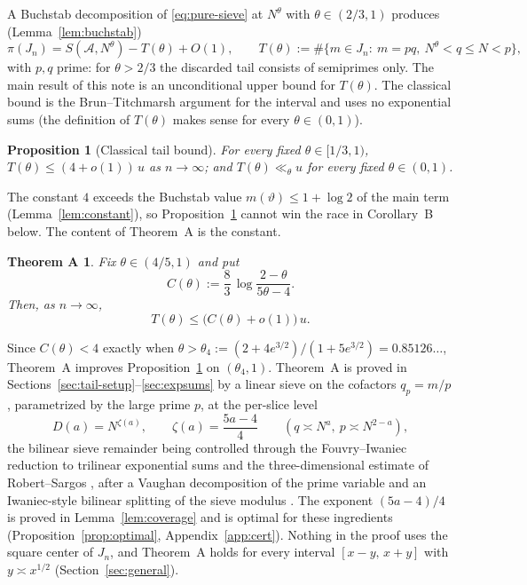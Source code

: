 \documentclass[11pt]{article}
\newtheorem{proposition}[theorem]{Proposition}
\newtheorem*{theoremA}{Theorem A}
\theoremstyle{remark}
\newcommand{\N}{N}
\newcommand{\J}{J_n}
\newcommand{\A}{\mathcal{A}}
\begin{document}
A Buchstab decomposition of \eqref{eq:pure-sieve} at $\N^{\theta}$ with
$\theta\in(2/3,1)$ produces (Lemma~\ref{lem:buchstab})
\begin{equation}\label{eq:buchstab-intro}
\pi(\J)=S(\A,\N^{\theta})-T(\theta)+O(1),\qquad
T(\theta):=\#\{m\in\J:\ m=pq,\ \N^{\theta}<q\le \N<p\},
\end{equation}
with $p,q$ prime: for $\theta>2/3$ the discarded tail consists of semiprimes only.
The main result of this note is an unconditional upper bound for $T(\theta)$. The
classical bound is the Brun--Titchmarsh argument for the interval and uses no
exponential sums (the definition of $T(\theta)$ makes sense for every
$\theta\in(0,1)$).

\begin{proposition}[Classical tail bound]\label{prop:classical}
For every fixed $\theta\in[1/3,1)$, $T(\theta)\le(4+o(1))\,u$ as $n\to\infty$; and
$T(\theta)\ll_{\theta}u$ for every fixed $\theta\in(0,1)$.
\end{proposition}

The constant $4$ exceeds the Buchstab value $m(\vartheta)\le 1+\log 2$ of the main term
(Lemma~\ref{lem:constant}), so Proposition~\ref{prop:classical} cannot win the race in
Corollary~B below. The content of Theorem~A is the constant.

\begin{theoremA}
Fix $\theta\in(4/5,1)$ and put
\[
C(\theta):=\frac{8}{3}\,\log\frac{2-\theta}{5\theta-4}.
\]
Then, as $n\to\infty$,
\[
T(\theta)\le \bigl(C(\theta)+o(1)\bigr)\,u .
\]
\end{theoremA}

Since $C(\theta)<4$ exactly when $\theta>\theta_4:=(2+4e^{3/2})/(1+5e^{3/2})=0.85126\ldots$,
Theorem~A improves Proposition~\ref{prop:classical} on $(\theta_4,1)$.
Theorem~A is proved in Sections~\ref{sec:tail-setup}--\ref{sec:expsums} by a linear
sieve on the cofactors $q_p=m/p$, parametrized by the large prime $p$, at the per-slice
level
\begin{equation}\label{eq:profile}
D(a)=\N^{\zeta(a)},\qquad \zeta(a)=\frac{5a-4}{4}\qquad (q\asymp \N^{a},\ p\asymp \N^{2-a}),
\end{equation}
the bilinear sieve remainder being controlled through the Fouvry--Iwaniec reduction to
trilinear exponential sums \cite{FI} and the three-dimensional estimate of
Robert--Sargos \cite{RS}, after a Vaughan decomposition of the prime variable and an
Iwaniec-style bilinear splitting of the sieve modulus \cite{Iwaniec80}. The exponent
$(5a-4)/4$ is proved in Lemma~\ref{lem:coverage} and is optimal for these ingredients
(Proposition~\ref{prop:optimal}, Appendix~\ref{app:cert}). Nothing in the proof uses
the square center of $\J$, and Theorem~A holds for every interval $[x-y,\,x+y]$ with
$y\asymp x^{1/2}$ (Section~\ref{sec:general}).
\end{document}
